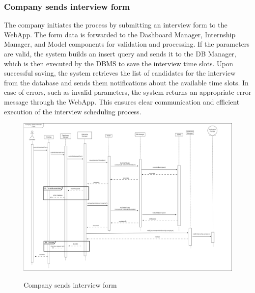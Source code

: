 \documentclass[a4paper,12pt]{article}
\begin{document}
\subsubsection*{Company sends interview form}
The company initiates the process by submitting an interview form to the WebApp. The form data is forwarded to the Dashboard Manager, Internship Manager, and Model components for validation and processing. If the parameters are valid, the system builds an insert query and sends it to the DB Manager, which is then executed by the DBMS to save the interview time slots. Upon successful saving, the system retrieves the list of candidates for the interview from the database and sends them notifications about the available time slots. In case of errors, such as invalid parameters, the system returns an appropriate error message through the WebApp. This ensures clear communication and efficient execution of the interview scheduling process.
\begin{figure}[H]
\centering
\includegraphics[scale = 0.30]{DD_figures/RuntimeView/CompanySendsInterviewFormRV.drawio.png}\\
\caption{Company sends interview form}
\end{figure}
\end{document}

